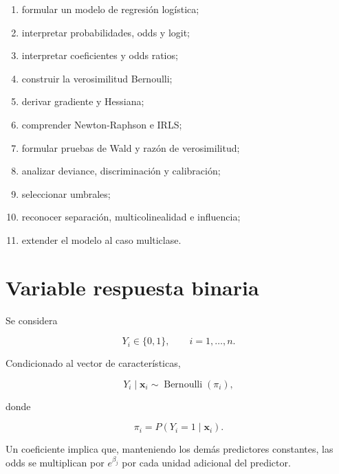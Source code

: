 \documentclass[
  spanish,
  10.5pt,
  letterpaper,
  DIV=11,
  numbers=noendperiod,
  oneside,
  open=any]{scrreprt}
\providecommand{\tightlist}{%
  \setlength{\itemsep}{0pt}\setlength{\parskip}{0pt}}
\theoremstyle{definition}
\theoremstyle{definition}
\theoremstyle{plain}
\theoremstyle{remark}
\begin{document}
\begin{enumerate}
\def\labelenumi{\arabic{enumi}.}
\tightlist
\item
  formular un modelo de regresión logística;
\item
  interpretar probabilidades, odds y logit;
\item
  interpretar coeficientes y odds ratios;
\item
  construir la verosimilitud Bernoulli;
\item
  derivar gradiente y Hessiana;
\item
  comprender Newton-Raphson e IRLS;
\item
  formular pruebas de Wald y razón de verosimilitud;
\item
  analizar deviance, discriminación y calibración;
\item
  seleccionar umbrales;
\item
  reconocer separación, multicolinealidad e influencia;
\item
  extender el modelo al caso multiclase.
\end{enumerate}

\section*{Variable respuesta binaria}\label{variable-respuesta-binaria}


Se considera

\[
Y_i\in\{0,1\},
\qquad i=1,\ldots,n.
\]

Condicionado al vector de características,

\[
Y_i\mid\mathbf{x}_i
\sim
\operatorname{Bernoulli}(\pi_i),
\]

donde

\[
\pi_i=P(Y_i=1\mid\mathbf{x}_i).
\]

\begin{tcolorbox}[enhanced jigsaw, arc=.35mm, bottomrule=.15mm, bottomtitle=1mm, breakable, colback=white, colbacktitle=quarto-callout-note-color!10!white, colframe=quarto-callout-note-color-frame, coltitle=black, left=2mm, leftrule=.75mm, opacityback=0, opacitybacktitle=0.6, rightrule=.15mm, title=\textcolor{quarto-callout-note-color}{\faInfo}\hspace{0.5em}{Odds y logit}, titlerule=0mm, toprule=.15mm, toptitle=1mm]

Un coeficiente implica que, manteniendo los demás predictores
constantes, las odds se multiplican por \(e^{\beta_j}\) por cada unidad
adicional del predictor.

\end{tcolorbox}
\end{document}
